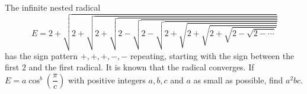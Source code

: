 The infinite nested radical
\[
E=2+\sqrt{2+\sqrt{2+\sqrt{2-\sqrt{2-\sqrt{2+\sqrt{2+\sqrt{2+\sqrt{2-\sqrt{2-\cdots}}}}}}}}}
\]
has the sign pattern $+,+,+,-,-$ repeating, starting with the sign between the first $2$ and the first radical. It is known that the radical converges. If $E=a\cos^b\left(\dfrac{\pi} {c}\right)$ with positive integers $a,b,c$ and $a$ as small as possible, find $a^2bc$.
